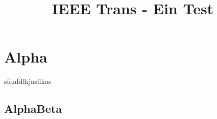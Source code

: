 \documentclass[9pt,conference]{IEEEtran}
\title{IEEE Trans -  Ein Test}
\author{
\IEEEauthorblockN{Dustin Walkter}
\IEEEauthorblockA{
	\textit{Fachhochschule Reutlingen}\\
	\textit{Mechatronik}\\
	\textit{XXX XXX}\\
}
\and 
\IEEEauthorblockN{Marco Späth}
\IEEEauthorblockA{
	\textit{Fachhochschule Reutlingen}\\
	\textit{Mechatronik}\\
	\textit{XXX XXX}\\
}
\and
\IEEEauthorblockN{Marco Mader Mendes}
\IEEEauthorblockA{
	\textit{Fachhochschule Reutlingen}\\
	\textit{Mechatronik}\\
	\textit{763 153}\\
}
	


}
\begin{document}
\maketitle
\tableofcontents




\section{Alpha}
sfdafdlkjasflkas
\subsection{AlphaBeta}
\end{document}

